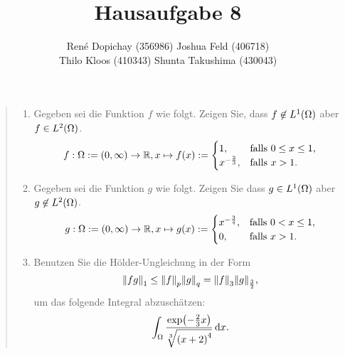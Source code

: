\documentclass{exercise}
\title{Hausaufgabe 8}
\author{René Dopichay (356986) \quad Joshua Feld (406718)\\Thilo Kloos (410343) \quad Shunta Takushima (430043)}
\begin{document}
	\maketitle


	\section{}

	\begin{quote}
		\begin{enumerate}
			\item Gegeben sei die Funktion \(f\) wie folgt.
			Zeigen Sie, dass \(f \not\in L^1\parentheses*{\Omega}\) aber \(f \in L^2\parentheses*{\Omega}\).
			\[
				f: \Omega := \parentheses*{0, \infty} \to \R, x \mapsto f\parentheses*{x} := \begin{cases}
					1, & \text{falls }0 \le x \le 1,\\
					x^{-\frac{2}{3}}, & \text{falls }x > 1.
				\end{cases}
			\]
			\item Gegeben sei die Funktion \(g\) wie folgt.
			Zeigen Sie dass \(g \in L^1\parentheses*{\Omega}\) aber \(g \not\in L^2\parentheses*{\Omega}\).
			\[
				g: \Omega := \parentheses*{0, \infty} \to \R, x \mapsto g\parentheses*{x} := \begin{cases}
					x^{-\frac{3}{4}}, & \text{falls }0 < x \le 1,\\
					0, & \text{falls }x > 1.
				\end{cases}
			\]
			\item Benutzen Sie die Hölder-Ungleichung in der Form
			\[
				\norm*{fg}_1 \le \norm*{f}_p \norm*{g}_q = \norm*{f}_3 \norm*{g}_{\frac{3}{2}},
			\]
			um das folgende Integral abzuschätzen:
			\[
				\int_\Omega \frac{\exp\parentheses*{-\frac{2}{3}x}}{\sqrt[3]{\parentheses*{x + 2}^4}}\d x.
			\]
		\end{enumerate}
	\end{quote}


	\section{}
\end{document}
